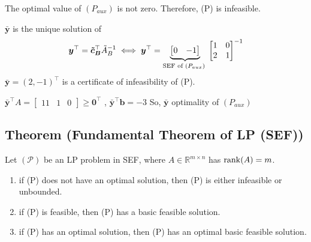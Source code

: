 The optimal value of $ (P_{aux}) $ is not zero. Therefore, (P) is
infeasible.

$ \bm{\bar{y}} $ is the unique solution of 
\[ \bm{y}^\top =\bm{\tilde{c}_B}^\top\tilde{A}_B^{-1} \iff 
\bm{y}^\top
=
\underbrace{\begin{bmatrix}0 & -1\end{bmatrix}}_
    {\text{SEF of $ (P_{aux}) $ }}
\begin{bmatrix}
    1 & 0\\
    2 & 1
\end{bmatrix}^{-1}
\]
$ \bm{\bar{y}}=(2,-1)^\top $
is a certificate of infeasibility of (P).

$ \bm{\bar{y}}^\top  A 
= \begin{bmatrix}11 & 1 & 0 \end{bmatrix}\ge \bm{0}^\top $ ,
$ \bm{\bar{y}}^\top \bm{b}=-3 $
So, $ \bm{\bar{y}} $ optimality of $ (P_{aux}) $

\begin{thmbox}
    \subsection{Theorem (Fundamental Theorem of LP (SEF))}
    Let $ (\mathcal{P}) $ be an LP problem in SEF, where $ A\in \mathbb{R}^{m\times n} $ has $ \operatorname{rank}(A)=m $.
    \begin{enumerate}[(1)]
        \item if (P) does not have an optimal solution, then (P) is either infeasible or unbounded.
        \item if (P) is feasible, then (P) has a basic feasible solution.
        \item if (P) has an optimal solution, then (P) has an optimal basic feasible solution.
    \end{enumerate}
\end{thmbox}